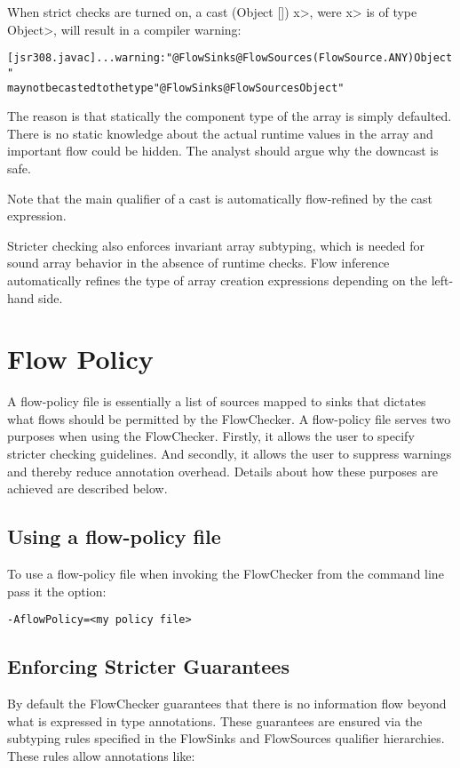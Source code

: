 When strict checks are turned on,
a cast \<(Object []) x>, were \<x> is of type \<Object>, will result
in a compiler warning:

\begin{alltt}
[jsr308.javac] ... warning: "@FlowSinks @FlowSources({FlowSource.ANY}) Object"
       may not be casted to the type "@FlowSinks @FlowSources Object"
\end{alltt}

The reason is that statically the component type of the array is
simply defaulted. There is no static knowledge about the actual
runtime values in the array and important flow could be hidden.
The analyst should argue why the downcast is safe.

Note that the main qualifier of a cast is automatically flow-refined
by the cast expression.


\medskip

Stricter checking also enforces invariant array subtyping, which is
needed for sound array behavior in the absence of runtime checks.
Flow inference automatically refines the type of array creation
expressions depending on the left-hand side.

\section{Flow Policy}

A flow-policy file is essentially a list of sources mapped to sinks
that dictates what flows should be permitted by the FlowChecker.  A
flow-policy file serves two purposes when using the FlowChecker.
Firstly, it allows the user to specify stricter checking guidelines.
And secondly, it allows the user to suppress warnings and thereby
reduce annotation overhead.  Details about how these purposes are
achieved are described below.

\subsection{Using a flow-policy file}
To use a flow-policy file when invoking the FlowChecker from the
command line pass it the option:
\begin{Verbatim}
-AflowPolicy=<my policy file>
\end{Verbatim}

\subsection{Enforcing Stricter Guarantees}
By default the FlowChecker guarantees that there is no information
flow beyond what is expressed in type annotations.  These guarantees
are ensured via the subtyping rules specified in the FlowSinks and
FlowSources qualifier hierarchies.  These rules allow annotations like:

